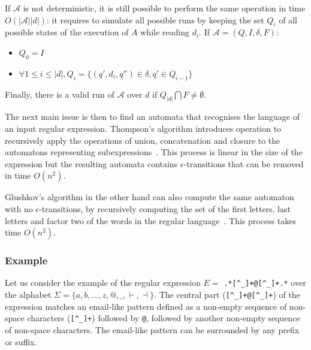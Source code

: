 \documentclass[12px]{article}
\theoremstyle{definition}
\begin{document}
        If $\mathcal{A}$ is not deterministic, it is still possible to perform
        the same operation in time $O(|\mathcal{A}| |d|)$: it requires to
        simulate all possible runs by keeping the set $Q_i$ of all possible
        states of the execution of $A$ while reading $d_i$. If $\mathcal{A} =
        (Q, I, \delta, F)$:
        \begin{itemize}
          \item $Q_0 = I$
          \item $\forall 1 \leq i \leq |d|, Q_i = \{(q', d_i, q'') \in \delta,
            q' \in Q_{i-1}\}$
        \end{itemize}
        Finally, there is a valid run of $\mathcal{A}$ over $d$ if $Q_{|d|}
        \bigcap F \neq \emptyset$.

        \vspace{0.5cm}

        The next main issue is then to find an automata that recognises the
        language of an input regular expression. Thompson's algorithm
        introduces operation to recursively apply the operations of union,
        concatenation and closure to the automatons representing
        subexpressions~\cite{thompson1968programming}. This process is linear
        in the size of the expression but the resulting automata contains
        $\epsilon$-transitions that can be removed in time $O(n^2)$.

        Glushkov's algorithm in the other hand can also compute the same
        automaton with no $\epsilon$-transitions, by recursively computing the
        set of the first letters, last letters and factor two of the words in
        the regular language~\cite{glushkov1961abstract}. This process takes
        time $O(n^2)$.

      \subsubsection{Example}%

        \label{sec:example_simple}

        Let us consider the example of the regular expression $E =$
        \texttt{.*[\textasciicircum\_]+@[\textasciicircum\_]+.*} over the
        alphabet $\Sigma = \{a, b, \ldots, z, @, \texttt \_, \vdash, \dashv\}$.
        The central part (\texttt{[\textasciicircum\_]+@[\textasciicircum\_]+})
        of the expression matches an email-like pattern defined as a non-empty
        sequence of non-space characters (\texttt{[\textasciicircum\_]+})
        followed by \texttt{@}, followed by another non-empty sequence of
        non-space characters. The email-like pattern can be surrounded by any
        prefix or suffix.
\end{document}

